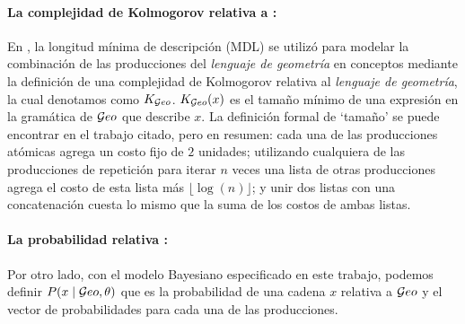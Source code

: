 \paragraph{La complejidad de Kolmogorov relativa a \boldmath{$\geom$}:}

En \cite{amalric2017language}, la longitud mínima de descripción (MDL) se utilizó para modelar la combinación de las producciones del \textit{lenguaje de geometría} en conceptos mediante la definición de una complejidad de Kolmogorov relativa al {\em lenguaje de geometría}, la cual denotamos como $K_{\mathcal Geo}$. $K_{\mathcal Geo}(x)$ es el tamaño mínimo de una expresión en la gramática de $\geom$ que describe $x$. La definición formal de `tamaño' se puede encontrar en el trabajo citado, pero en resumen: cada una de las producciones atómicas agrega un costo fijo de $2$ unidades; utilizando cualquiera de las producciones de repetición para iterar $n$ veces una lista de otras producciones agrega el costo de esta lista más $\lfloor \log(n) \rfloor$; y unir dos listas con una concatenación cuesta lo mismo que la suma de los costos de ambas listas.


\paragraph{La probabilidad relativa \boldmath{$\geom$}:} Por otro lado, con el modelo Bayesiano especificado en este trabajo, podemos definir $P(x \mid \mathcal Geo, \theta)$ que es la probabilidad de una cadena $x$ relativa a $\geom$ y el vector de probabilidades para cada una de las producciones.

